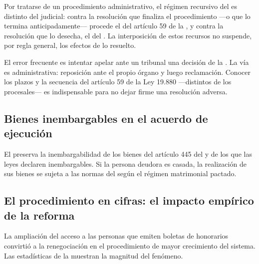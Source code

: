 Por tratarse de un procedimiento administrativo, el régimen recursivo del  es distinto
del judicial: contra la resolución que finaliza el procedimiento ---o que lo termina
anticipadamente--- procede el  del artículo 59 de
la , y contra la resolución que
lo desecha, el  del . La interposición de estos
recursos no suspende, por regla general, los efectos de lo resuelto.

\begin{foco}
El error frecuente es intentar apelar ante un tribunal una decisión de la \superir{}. La vía es
administrativa: reposición ante el propio órgano y luego reclamación. Conocer los plazos y la
secuencia del artículo 59 de la Ley 19.880 ---distintos de los procesales--- es indispensable para
no dejar firme una resolución adversa.
\end{foco}

\subsection{Bienes inembargables en el acuerdo de ejecución}

El  preserva la inembargabilidad de los bienes del artículo 445 del \cpc{} y de los que las leyes
declaren inembargables. Si la persona deudora es casada, la realización de sus bienes se sujeta a
las normas del \cc{} según el régimen matrimonial pactado.

\subsection{El procedimiento en cifras: el impacto empírico de la reforma}

La ampliación del acceso a las personas que emiten boletas de honorarios convirtió a la
renegociación en el procedimiento de mayor crecimiento del sistema. Las estadísticas de la
\superir{} \parencite{superir-estadisticas-2025} muestran la magnitud del fenómeno.

